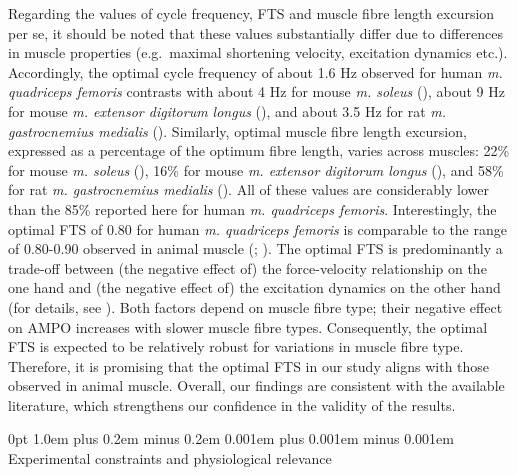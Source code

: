 \documentclass[
  11pt,
  a4paper]{article}
\makeatletter
\renewcommand{\subsection}{%
  \@startsection{subsection}{2}
    {0pt} 					%
    {1.0em plus 0.2em minus 0.2em} 	%
    {0.001em plus 0.001em minus 0.001em}    	%
    {\large\bfseries\sffamily}%
}
\makeatother
\begin{document}
Regarding the values of cycle frequency, FTS and muscle fibre length
excursion per se, it should be noted that these values substantially
differ due to differences in muscle properties (e.g.~maximal shortening
velocity, excitation dynamics etc.). Accordingly, the optimal cycle
frequency of about 1.6 Hz observed for human \emph{m. quadriceps
femoris} contrasts with about 4 Hz for mouse \emph{m. soleus}
(), about 9 Hz
for mouse \emph{m. extensor digitorum longus}
(), and about
3.5 Hz for rat \emph{m. gastrocnemius medialis}
().
Similarly, optimal muscle fibre length excursion, expressed as a
percentage of the optimum fibre length, varies across muscles: 22\% for
mouse \emph{m. soleus} (), 16\% for mouse \emph{m. extensor digitorum longus}
(), and 58\% for
rat \emph{m. gastrocnemius medialis}
(). All of
these values are considerably lower than the 85\% reported here for
human \emph{m. quadriceps femoris}. Interestingly, the optimal FTS of
0.80 for human \emph{m. quadriceps femoris} is comparable to the range
of 0.80-0.90 observed in animal muscle
(;
). The
optimal FTS is predominantly a trade-off between (the negative effect
of) the force-velocity relationship on the one hand and (the negative
effect of) the excitation dynamics on the other hand (for details, see
). Both
factors depend on muscle fibre type; their negative effect on AMPO
increases with slower muscle fibre types. Consequently, the optimal FTS
is expected to be relatively robust for variations in muscle fibre type.
Therefore, it is promising that the optimal FTS in our study aligns with
those observed in animal muscle. Overall, our findings are consistent
with the available literature, which strengthens our confidence in the
validity of the results.

\subsection{Experimental constraints and physiological
relevance}\label{experimental-constraints-and-physiological-relevance}
\end{document}
